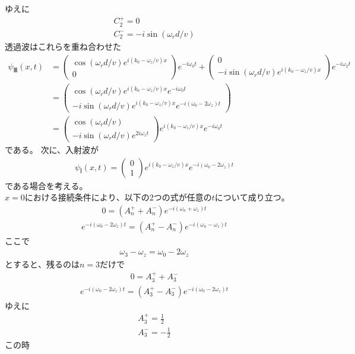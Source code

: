 ゆえに
\begin{align}
C_{2}^{+}=0 \\
C_{2}^{-}=-i\sin({{\omega_{r}}d/v})
\end{align}
透過波はこれらを重ね合わせた
\begin{align}
{\psi}_{Ⅲ}(x,t)&=
\begin{pmatrix}
\cos({{\omega_{r}}d/v})e^{i(k_{0}-\omega_{z}/v)x} \\
0
\end{pmatrix}
e^{-i\omega_{0}t}+
\begin{pmatrix}
0 \\
-i\sin({{\omega_{r}}d/v})e^{i(k_{0}-\omega_{z}/v)x}
\end{pmatrix}
e^{-i\omega_{2}t} \\
&=\begin{pmatrix}
\cos({{\omega_{r}}d/v})e^{i(k_{0}-\omega_{z}/v)x}e^{-i\omega_{0}t} \\
-i\sin({{\omega_{r}}d/v})e^{i(k_{0}-\omega_{z}/v)x}e^{-i(\omega_{0}-2\omega_{z})t}
\end{pmatrix} \\
&=\begin{pmatrix}
\cos({{\omega_{r}}d/v}) \\
-i\sin({{\omega_{r}}d/v})e^{2i\omega_{z}t}
\end{pmatrix} 
e^{i(k_{0}-\omega_{z}/v)x}e^{-i\omega_{0}t}
\end{align}
である。
次に、入射波が
\begin{align}
{\psi}_{Ⅰ}(x,t)=
\begin{pmatrix}
0 \\
1
\end{pmatrix}
e^{i(k_{0}-\omega_{z}/v)x}e^{-i(\omega_{0}-2\omega_{z})t}
\end{align}
である場合を考える。
$x=0における接続条件により、以下の2つの式が任意のtについて成り立つ。$
\begin{align}
0=\left(A_{n}^{+}+A_{n}^{-}\right)e^{-i(\omega_{n}+\omega_{z})t}
\end{align}
\begin{align}
e^{-i(\omega_{0}-2\omega_{z})t}=\left(A_{n}^{+}-A_{n}^{-}\right)e^{-i(\omega_{n}-\omega_{z})t}
\end{align}
ここで
\begin{align}
\omega_{3}-\omega_{z}=\omega_{0}-2\omega_{z}
\end{align}
$とすると、残るのはn=3だけで$
\begin{align}
0=A_{3}^{+}+A_{3}^{-}
\end{align}
\begin{align}
e^{-i(\omega_{0}-2\omega_{z})t}=\left(A_{3}^{+}-A_{3}^{-}\right)e^{-i(\omega_{0}-2\omega_{z})t}
\end{align}
ゆえに
\begin{align}
A_{3}^{+}=\frac{1}{2} \\
A_{3}^{-}=-\frac{1}{2}
\end{align}
この時

